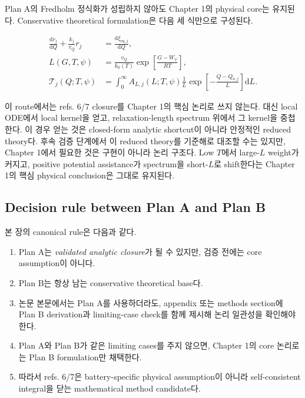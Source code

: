 \documentclass[11pt]{article}
\newcommand{\dd}{\mathrm{d}}
\newcommand{\eq}{\mathrm{eq}}
\begin{document}
Plan A의 Fredholm 정식화가 성립하지 않아도 Chapter 1의 physical core는 유지된다. Conservative
theoretical formulation은 다음 세 식만으로 구성된다.

\begin{align}
\frac{\dd r_j}{\dd Q}+\frac{k_j}{v_Q}r_j
&=
\frac{\dd\xi_{\eq,j}}{\dd Q},
\label{eq:planb_residual}
\\
L(G,T,\psi)
&=
\frac{v_Q}{k_0(T)}
\exp\!\left[\frac{G-W_\psi}{RT}\right],
\label{eq:planb_length}
\\
\mathcal T_j(Q;T,\psi)
&=
\int_0^\infty
A_{L,j}(L;T,\psi)\frac{1}{L}
\exp\!\left[-\frac{Q-Q_{a,j}}{L}\right]\dd L .
\label{eq:planb_tail}
\end{align}

이 route에서는 refs. 6/7 closure를 Chapter 1의 핵심 논리로 쓰지 않는다. 대신 local ODE에서 local
kernel을 얻고, relaxation-length spectrum 위에서 그 kernel을 중첩한다. 이 경우 얻는 것은
closed-form analytic shortcut이 아니라 안정적인 reduced theory다. 후속 검증 단계에서 이
reduced theory를 기준해로 대조할 수는 있지만, Chapter 1에서 필요한 것은 구현이 아니라
논리 구조다. Low \(T\)에서 large-\(L\) weight가 커지고, positive potential assistance가 spectrum을
short-\(L\)로 shift한다는 Chapter 1의 핵심 physical conclusion은 그대로 유지된다.

\subsection{Decision rule between Plan A and Plan B}\label{subsec:closure_decision}

본 장의 canonical rule은 다음과 같다.

\begin{enumerate}[label=\textbf{R\arabic*.}]
\item Plan A는 \emph{validated analytic closure}가 될 수 있지만, 검증 전에는 core assumption이 아니다.
\item Plan B는 항상 남는 conservative theoretical base다.
\item 논문 본문에서는 Plan A를 사용하더라도, appendix 또는 methods section에 Plan B derivation과
limiting-case check를 함께 제시해 논리 일관성을 확인해야 한다.
\item Plan A와 Plan B가 같은 limiting cases를 주지 않으면, Chapter 1의 core 논리로는 Plan B
formulation만 채택한다.
\item 따라서 refs. 6/7은 battery-specific physical assumption이 아니라 self-consistent integral을
닫는 mathematical method candidate다.
\end{enumerate}
\end{document}
